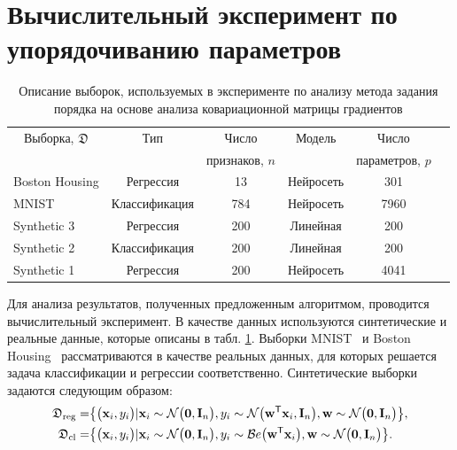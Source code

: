 \section{Вычислительный эксперимент по упорядочиванию параметров}

\begin{table}[h!t]
\begin{center}
\caption{Описание выборок, используемых в эксперименте по анализу метода задания порядка на основе анализа ковариационной матрицы градиентов}
\label{tb:ex:1}
\begin{tabular}{|c|c|c|c|c|c|}
\hline
	Выборка, $\mathfrak{D}$& Тип & Число& Модель& Число \\
	&& признаков, $n$&&параметров, $p$\\
	\hline
	\multicolumn{1}{|l|}{Boston Housing}&
	Регрессия& 13& Нейросеть& 301\\
	\hline
	\multicolumn{1}{|l|}{MNIST}&
	Классификация& 784& Нейросеть& 7960\\
	\hline
	\multicolumn{1}{|l|}{Synthetic 3}&
	Регрессия& 200& Линейная& 200\\
	\hline
	\multicolumn{1}{|l|}{Synthetic 2}&
	Классификация& 200& Линейная& 200\\
	\hline
	\multicolumn{1}{|l|}{Synthetic 1}&
	Регрессия& 200& Нейросеть& 4041\\
\hline

\end{tabular}
\end{center}
\end{table}

Для анализа результатов, полученных предложенным алгоритмом, проводится вычислительный эксперимент. В качестве данных используются синтетические и реальные данные, которые описаны в табл. \ref{tb:ex:1}. Выборки MNIST~\cite{mnist} и Boston Housing~\cite{Boston} рассматриваются в качестве реальных данных, для которых решается задача классификации и регрессии соответственно. Синтетические выборки задаются следующим образом:
\[
\label{eq:ex:1}
\begin{aligned}
\mathfrak{D}_{\text{\text{reg}}} &= \bigr\{\bigr(\textbf{x}_i, y_i \bigr) |\textbf{x}_{i}\sim\mathcal{N}\bigr(\textbf{0}, \textbf{I}_{n}\bigr), y_{i}\sim\mathcal{N}\bigr(\textbf{w}^{\mathsf{T}}\textbf{x}_{i}, \textbf{I}_{n}\bigr),  \textbf{w} \sim \mathcal{N}\bigr(\textbf{0}, \textbf{I}_{n}\bigr)\bigr\},\\
\mathfrak{D}_{\text{\text{cl}}} &= \bigr\{\bigr(\textbf{x}_i, y_i \bigr) |\textbf{x}_{i}\sim\mathcal{N}\bigr(\textbf{0}, \textbf{I}_{n}\bigr), y_{i}\sim\mathcal{B}e\bigr(\textbf{w}^{\mathsf{T}}\textbf{x}_{i}\bigr),  \textbf{w} \sim \mathcal{N}\bigr(\textbf{0}, \textbf{I}_{n}\bigr)\bigr\}.
\end{aligned}
\]

